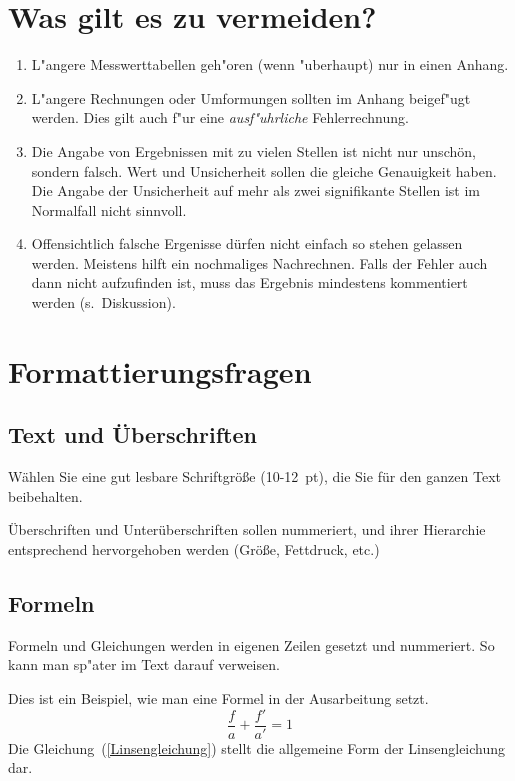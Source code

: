 \documentclass[a4paper,11pt]{article}
\begin{document}
\section{Was gilt es zu vermeiden?}
\begin{enumerate}
\item L"angere Messwerttabellen geh"oren (wenn "uberhaupt) nur in einen Anhang.
\item L"angere Rechnungen oder Umformungen sollten im Anhang beigef"ugt werden.
      Dies gilt auch f"ur eine \emph{ausf"uhrliche} Fehlerrechnung. 
\item Die Angabe von Ergebnissen mit zu vielen Stellen ist nicht nur
      unschön, sondern falsch.\newline 
      Wert und Unsicherheit sollen die gleiche Genauigkeit haben. Die Angabe
      der Unsicherheit auf mehr als zwei signifikante Stellen ist im Normalfall
      nicht sinnvoll.
\item Offensichtlich falsche Ergenisse dürfen nicht einfach so stehen gelassen werden.
      Meistens hilft ein nochmaliges Nachrechnen. Falls der Fehler auch dann nicht
      aufzufinden ist, muss das Ergebnis mindestens kommentiert werden (s.~Diskussion).
\end{enumerate}


\section{Formattierungsfragen}
\subsection{Text und Überschriften}
Wählen Sie eine gut lesbare Schriftgröße (10-12~pt), die Sie für den 
ganzen Text beibehalten.%

Überschriften und Unterüberschriften sollen nummeriert,
und ihrer Hierarchie entsprechend hervorgehoben werden (Größe, Fettdruck, etc.)

\subsection{Formeln}
Formeln und Gleichungen werden in eigenen Zeilen gesetzt und nummeriert. 
So kann man sp"ater im Text darauf verweisen. 
\begin{center}
\parbox{7cm}{\small
Dies ist ein Beispiel, wie man eine 
Formel in der Ausarbeitung setzt.
\begin{equation}\label{Linsengleichung}
\frac{f}{a} + \frac{f'}{a'} = 1
\end{equation} 
Die Gleichung~(\ref{Linsengleichung}) stellt die
allgemeine Form der Linsengleichung dar.}
\end{center}
\end{document}
